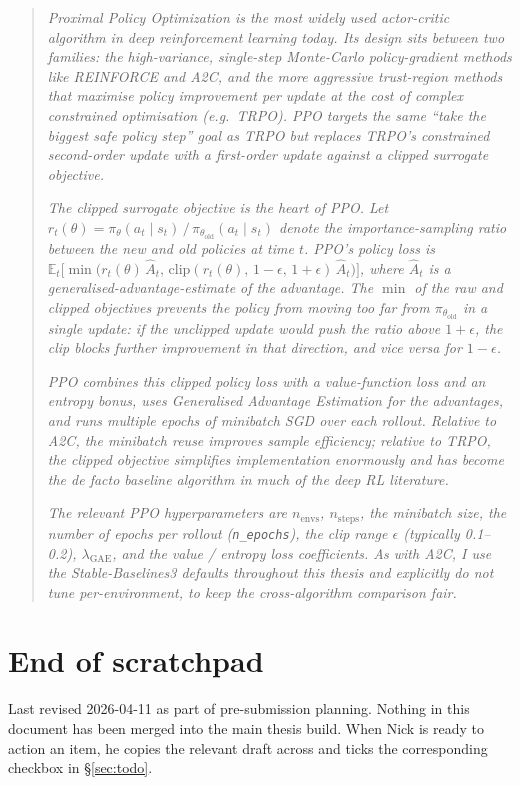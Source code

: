 \documentclass[11pt,a4paper]{article}
\begin{document}
\begin{quote}
\textit{Proximal Policy Optimization \cite{schulman2017ppo} is the most
widely used actor-critic algorithm in deep reinforcement learning
today. Its design sits between two families: the high-variance,
single-step Monte-Carlo policy-gradient methods like REINFORCE and A2C,
and the more aggressive trust-region methods that maximise policy
improvement per update at the cost of complex constrained optimisation
(e.g.~TRPO). PPO targets the same ``take the biggest safe policy step''
goal as TRPO but replaces TRPO's constrained second-order update with a
first-order update against a clipped surrogate objective.}

\textit{The clipped surrogate objective is the heart of PPO. Let
$r_t(\theta) = \pi_\theta(a_t \mid s_t) \,/\, \pi_{\theta_{\text{old}}}(a_t
\mid s_t)$ denote the importance-sampling ratio between the new and old
policies at time $t$. PPO's policy loss is
$\mathbb{E}_t \big[\min\!\big(r_t(\theta)\,\hat A_t,\,
\mathrm{clip}(r_t(\theta),\,1-\epsilon,\,1+\epsilon)\,\hat A_t\big)\big]$,
where $\hat A_t$ is a generalised-advantage-estimate of the advantage.
The $\min$ of the raw and clipped objectives prevents the policy from
moving too far from $\pi_{\theta_{\text{old}}}$ in a single update: if
the unclipped update would push the ratio above $1+\epsilon$, the clip
blocks further improvement in that direction, and vice versa for
$1-\epsilon$.}

\textit{PPO combines this clipped policy loss with a value-function
loss and an entropy bonus, uses Generalised Advantage Estimation
\cite{schulman2015gae} for the advantages, and runs multiple epochs of
minibatch SGD over each rollout. Relative to A2C, the minibatch reuse
improves sample efficiency; relative to TRPO, the clipped objective
simplifies implementation enormously and has become the de facto
baseline algorithm in much of the deep RL literature.}

\textit{The relevant PPO hyperparameters are $n_{\text{envs}}$,
$n_{\text{steps}}$, the minibatch size, the number of epochs per
rollout (\texttt{n\_epochs}), the clip range $\epsilon$ (typically
0.1--0.2), $\lambda_{\text{GAE}}$, and the value / entropy loss
coefficients. As with A2C, I use the Stable-Baselines3 defaults
throughout this thesis and explicitly do not tune per-environment, to
keep the cross-algorithm comparison fair.}
\end{quote}

\section*{End of scratchpad}

Last revised 2026-04-11 as part of pre-submission planning. Nothing in
this document has been merged into the main thesis build. When Nick
is ready to action an item, he copies the relevant draft across and
ticks the corresponding checkbox in \S\ref{sec:todo}.
\end{document}
